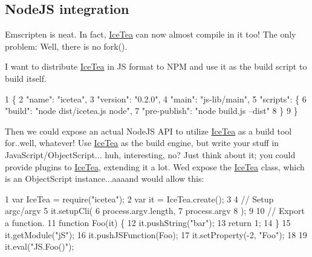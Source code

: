 \subsection*{Node\+JS integration}

Emscripten is neat. In fact, \hyperlink{class_ice_tea}{Ice\+Tea} can now almost compile in it too! The only problem\+: Well, there is no {\ttfamily fork()}.

I want to distribute \hyperlink{class_ice_tea}{Ice\+Tea} in JS format to N\+PM and use it as the build script to build itself. 
\begin{DoxyCode}
1 \{
2     "name": "icetea",
3     "version": "0.2.0",
4     "main": "js-lib/main",
5     "scripts": \{
6         "build": "node dist/icetea.js node",
7         "pre-publish": "node build.js --dist"
8     \}
9 \}
\end{DoxyCode}


Then we could expose an actual Node\+JS A\+PI to utilize \hyperlink{class_ice_tea}{Ice\+Tea} as a build tool for..well, whatever! Use \hyperlink{class_ice_tea}{Ice\+Tea} as the build engine, but write your stuff in Java\+Script/\+Object\+Script... huh, interesting, no? Just think about it; you could provide plugins to \hyperlink{class_ice_tea}{Ice\+Tea}, extending it a lot. We\textquotesingle{}d expose the \hyperlink{class_ice_tea}{Ice\+Tea} class, which is an Object\+Script instance...aaaand would allow this\+:


\begin{DoxyCode}
1 var IceTea = require("icetea");
2 var it = IceTea.create();
3 
4 // Setup argc/argv
5 it.setupCli(
6     process.argv.length,
7     process.argv
8 );
9 
10 // Export a function.
11 function Foo(it) \{
12     it.pushString("bar");
13     return 1;
14 \}
15 it.getModule("jS");
16 it.pushJSFunction(Foo);
17 it.setProperty(-2, "Foo");
18 
19 it.eval("JS.Foo()");
\end{DoxyCode}
 